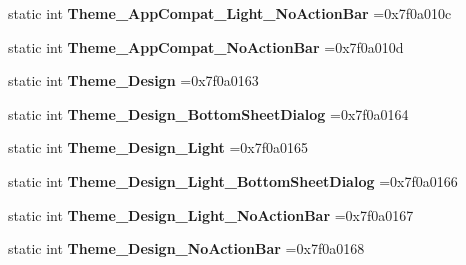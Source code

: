 \begin{DoxyCompactItemize}
\mbox{\label{classandroid_1_1support_1_1v4_1_1R_1_1style_a50dd98550a6779b46c9c0252b9ca43a4}} 
static int {\bfseries Theme\+\_\+\+App\+Compat\+\_\+\+Light\+\_\+\+No\+Action\+Bar} =0x7f0a010c
\item 
\mbox{\label{classandroid_1_1support_1_1v4_1_1R_1_1style_a675be517d20f7f785bf819175458972e}} 
static int {\bfseries Theme\+\_\+\+App\+Compat\+\_\+\+No\+Action\+Bar} =0x7f0a010d
\item 
\mbox{\label{classandroid_1_1support_1_1v4_1_1R_1_1style_a00fd60ef154ccd113ecf3b4b29567496}} 
static int {\bfseries Theme\+\_\+\+Design} =0x7f0a0163
\item 
\mbox{\label{classandroid_1_1support_1_1v4_1_1R_1_1style_ae924a368f1ace7654dd7b03583cc4955}} 
static int {\bfseries Theme\+\_\+\+Design\+\_\+\+Bottom\+Sheet\+Dialog} =0x7f0a0164
\item 
\mbox{\label{classandroid_1_1support_1_1v4_1_1R_1_1style_ac93f4cfa9557f66a5057b88d4cbedc49}} 
static int {\bfseries Theme\+\_\+\+Design\+\_\+\+Light} =0x7f0a0165
\item 
\mbox{\label{classandroid_1_1support_1_1v4_1_1R_1_1style_a1d9962731badeafcac3c6b5308659559}} 
static int {\bfseries Theme\+\_\+\+Design\+\_\+\+Light\+\_\+\+Bottom\+Sheet\+Dialog} =0x7f0a0166
\item 
\mbox{\label{classandroid_1_1support_1_1v4_1_1R_1_1style_a10c64fff8f87ae4295ca377431cc6f6c}} 
static int {\bfseries Theme\+\_\+\+Design\+\_\+\+Light\+\_\+\+No\+Action\+Bar} =0x7f0a0167
\item 
\mbox{\label{classandroid_1_1support_1_1v4_1_1R_1_1style_a06d255f33fbdacd8af12705fafa44c9e}} 
static int {\bfseries Theme\+\_\+\+Design\+\_\+\+No\+Action\+Bar} =0x7f0a0168
\item 
\mbox{\label{classandroid_1_1support_1_1v4_1_1R_1_1style_ab2aec0948d7235c1597fe901bed2a3bd}} 

\end{DoxyCompactItemize}
